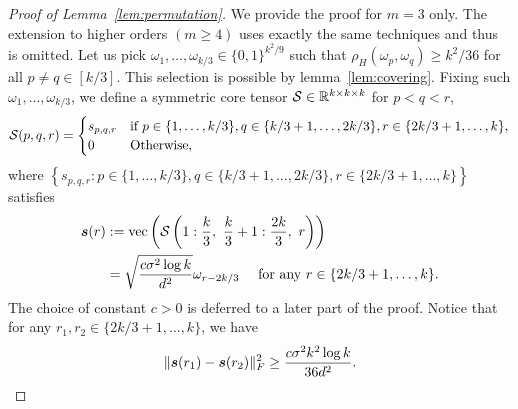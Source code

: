 \documentclass[11pt]{article}
\theoremstyle{definition}
\begin{document}
\begin{proof}[Proof of Lemma~\ref{lem:permutation}]
We provide the proof for $m=3$ only. The extension to higher orders $(m\geq 4)$ uses exactly the same techniques and thus is omitted. 
Let us pick $\omega_1,\ldots,\omega_{k/3}\in\{0,1\}^{k^2/9}$ such that $\rho_H(\omega_p,\omega_q)\geq k^2/36$ for all $p\neq q\in [k/3]$. This selection is possible by lemma~\ref{lem:covering}.
Fixing such $\omega_1,\ldots,\omega_{k/3}$, we define a symmetric core tensor $\mathcal{S}\in\mathbb{R}^{k\times k\times k}$ for $p<q<r$,
\begin{align}
    \mathcal{S}(p,q,r) = \begin{cases}s_{p,q,r} &\text{if }p\in\{1,\ldots,k/3\},q\in\{k/3+1,\ldots,2k/3\}, r\in\{2k/3+1,\ldots,k\},\\0 &\text{Otherwise,}
    \end{cases}
\end{align}
where $\left\{s_{p,q,r}\colon p\in\{1,\ldots,k/3\},q\in\{k/3+1,\ldots,2k/3\}, r\in\{2k/3+1,\ldots,k \}\right\}$ satisfies
\begin{align}
\label{eq:structure}
    \ms(r)&:= \text{vec}\left(\tS\left(1:\frac{k}{3},\ \frac{k}{3}+1:\frac{2k}{3},\ r\right)\right)\\
    &= \sqrt{c\sigma^2\log k\over d^{2}}\omega_{r-2k/3} \quad \text{ for any } r\in\{2k/3+1,\ldots,k\}.
\end{align}
The choice of constant $c>0$ is deferred to a later part of the proof.
Notice that for any $r_1,r_2\in\{2k/3+1,\ldots,k\}$, we have
\begin{align}\label{eq:sr}
    \lVert\bm{s}(r_1)-\bm{s}(r_2)\rVert_F^2\geq \frac{c\sigma^2k^2\log k}{36d^2}.
\end{align}


\end{proof}
\end{document}
